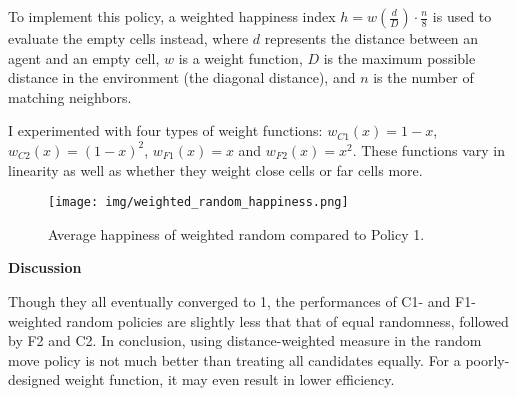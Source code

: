 \documentclass[12pt, titlepage]{article}
\begin{document}
	To implement this policy, a weighted happiness index
	$h = w \left( \frac{d}{D} \right) \cdot \frac{n}{8}$ is used to evaluate the
	empty cells instead, where $d$ represents the distance between an agent and
	an empty cell, $w$ is a weight function, $D$ is the maximum possible distance
	in the environment (the diagonal distance), and $n$ is the number of matching
	neighbors.

	I experimented with four types of weight functions: $w_{C1}(x) = 1 - x$,
	$w_{C2}(x) = {(1 - x)}^2$, $w_{F1}(x) = x$ and $w_{F2}(x) = x^2$.
	These functions vary in linearity as well as whether they weight close cells
	or far cells more.

	\vspace{-12pt}
	\begin{figure}[htb]
		\centering
		\texttt{[image: img/weighted\_random\_happiness.png]}
		\vspace{-12pt}
		\caption{Average happiness of weighted random compared to Policy 1.}%
		\label{fig:LIU_happiness}
	\end{figure}
	\vspace{-12pt}
	\par \textbf{Discussion}
	\par Though they all eventually converged to 1, the performances of C1- and
	F1-weighted random policies are slightly less that that of equal randomness,
	followed by F2 and C2.
	In conclusion, using distance-weighted measure in the random move policy is
	not much better than treating all candidates equally.
	For a poorly-designed weight function, it may even result in lower efficiency.
	\newpage
\end{document}
